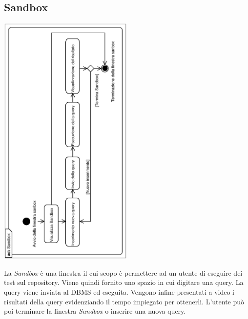 \documentclass[11pt,titlepage,a4paper]{report}
\begin{document}
\subsection{Sandbox}
\begin{center}
 \includegraphics[width=0.5\textwidth, angle=-90]{Sandbox.eps}
\end{center}
La \textit{Sandbox} \`e una finestra il cui scopo \`e permettere ad un utente di eseguire dei test sul repository. Viene quindi fornito uno spazio in cui digitare una query. La query viene inviata al DBMS ed eseguita. Vengono infine presentati a video i risultati della query evidenziando il tempo impiegato per ottenerli. L'utente pu\`o poi terminare la finestra \textit{Sandbox} o inserire una nuova query.
\end{document}
